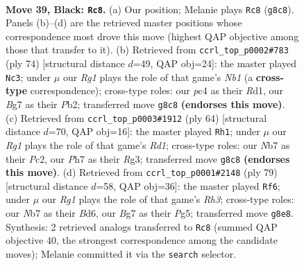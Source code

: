 \documentclass[11pt]{article}
\begin{document}
\clearpage

\begin{figure}[p]\centering
\begin{subfigure}{0.46\textwidth}\centering
\resizebox{\linewidth}{!}{%
\newchessgame
\chessboard[
  setfen={6r1/rn3kbp/p2p2p1/4p1P1/PpP1P2P/1P3PBR/3K2B1/R7 b - c3 0 39},
  showmover=false,
  pgfstyle=straightmove, color=movearrow, markmove={g8-c8}
]}
\caption{}
\end{subfigure}\hfill
\begin{subfigure}{0.46\textwidth}\centering
\resizebox{\linewidth}{!}{%
\newchessgame
\chessboard[
  setfen={r1b1k3/2b5/1pp3p1/2p1PpPp/p4P2/P3B1P1/1PP2K2/1N1R4 w - - 0 38},
  showmover=false,
  pgfstyle=straightmove, color=movearrow, markmove={b1-c3}
]}
\caption{}
\end{subfigure}
\\[4pt]
\begin{subfigure}{0.46\textwidth}\centering
\resizebox{\linewidth}{!}{%
\newchessgame
\chessboard[
  setfen={5r2/1p2r1p1/2bk1p1p/p2p3P/P2K1PP1/1P1B2R1/2P5/3R4 w - - 11 33},
  showmover=false,
  pgfstyle=straightmove, color=movearrow, markmove={d1-h1}
]}
\caption{}
\end{subfigure}\hfill
\begin{subfigure}{0.46\textwidth}\centering
\resizebox{\linewidth}{!}{%
\newchessgame
\chessboard[
  setfen={3r4/1p3pk1/pPpbp2r/P5p1/3PR2p/1KPB3P/5PP1/5R2 b - - 19 40},
  showmover=false,
  pgfstyle=straightmove, color=movearrow, markmove={h6-f6}
]}
\caption{}
\end{subfigure}
\caption{\textbf{Move 39, Black: \texttt{Rc8}.} (a) Our position; Melanie plays \texttt{Rc8} (\texttt{g8c8}). Panels (b)--(d) are the retrieved master positions whose correspondence most drove this move (highest QAP objective among those that transfer to it). (b) Retrieved from \texttt{ccrl\_top\_p0002\#783} (ply 74) [structural distance $d$=49, QAP obj=24]: the master played \texttt{Nc3}; under $\mu$ our \emph{Rg1} plays the role of that game's \emph{Nb1} (a \textbf{cross-type} correspondence); cross-type roles: our \emph{p}c4 as their \emph{R}d1, our \emph{B}g7 as their \emph{P}b2; transferred move \texttt{g8c8} \textbf{(endorses this move)}. (c) Retrieved from \texttt{ccrl\_top\_p0003\#1912} (ply 64) [structural distance $d$=70, QAP obj=16]: the master played \texttt{Rh1}; under $\mu$ our \emph{Rg1} plays the role of that game's \emph{Rd1}; cross-type roles: our \emph{N}b7 as their \emph{P}c2, our \emph{P}h7 as their \emph{R}g3; transferred move \texttt{g8c8} \textbf{(endorses this move)}. (d) Retrieved from \texttt{ccrl\_top\_p0001\#2148} (ply 79) [structural distance $d$=58, QAP obj=36]: the master played \texttt{Rf6}; under $\mu$ our \emph{Rg1} plays the role of that game's \emph{Rh3}; cross-type roles: our \emph{N}b7 as their \emph{B}d6, our \emph{B}g7 as their \emph{P}g5; transferred move \texttt{g8e8}. Synthesis: 2 retrieved analogs transferred to \texttt{Rc8} (summed QAP objective 40, the strongest correspondence among the candidate moves); Melanie committed it via the \texttt{search} selector.}
\label{fig:thought-m77}
\end{figure}
\end{document}
